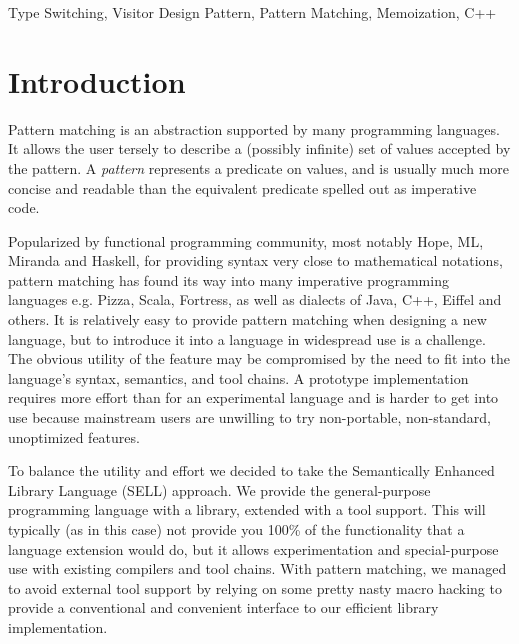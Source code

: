 \documentclass[preprint]{sigplanconf}
\begin{document}
\keywords
Type Switching, Visitor Design Pattern, Pattern Matching, Memoization, C++

\section{Introduction} %
\label{sec:intro}


Pattern matching is an abstraction supported by many programming languages.
It allows the user tersely to describe a (possibly infinite) set of 
values accepted by the pattern. A \emph{pattern} represents a predicate on 
values, and is usually  much more concise and readable than the 
equivalent predicate spelled out as imperative code.

Popularized by functional programming community, most notably Hope\cite{BMS80}, 
ML\cite{ML90}, Miranda\cite{Miranda85} and Haskell\cite{Haskell98Book}, for 
providing syntax very close to mathematical notations, pattern matching has 
found its way into many imperative programming languages e.g. 
Pizza\cite{Odersky97pizzainto}, Scala\cite{Scala2nd}, Fortress\cite{RPS10}, as 
well as dialects of Java\cite{Liu03jmatch:iterable,HydroJ2003}, C++\cite{Prop96}, 
Eiffel\cite{Moreau:2003} and others. It is relatively easy to provide pattern 
matching when designing a new language, but to introduce it into a language in 
widespread use is a challenge. The obvious utility of the feature may be 
compromised by the need to fit into the language's syntax, semantics, and tool 
chains. A prototype implementation requires more effort than for an experimental 
language and is harder to get into use because mainstream users are unwilling 
to try non-portable, non-standard, unoptimized features.

To balance the utility and effort we decided to take the Semantically 
Enhanced Library Language (SELL) approach\cite{SELL}. We provide the
general-purpose programming language with a library, extended with a tool 
support. This will typically (as in this case) not provide you 100\% of the functionality that a 
language extension would do, but it allows experimentation and special-purpose use
with existing compilers and tool chains. With pattern matching, we managed to avoid 
external tool support by relying on some pretty nasty macro hacking to provide a
conventional and convenient interface to our efficient library implementation.
\end{document}
